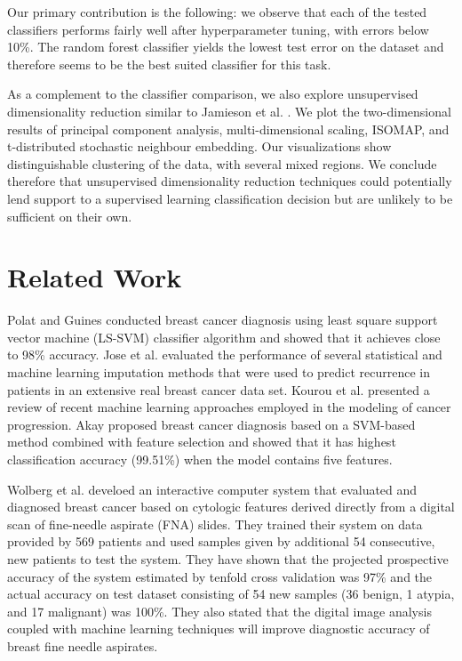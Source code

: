 \documentclass{article}
\begin{document}
Our primary contribution is the following: we observe that each of the tested classifiers performs fairly well after hyperparameter tuning, with errors below 10\%. The random forest classifier yields the lowest test error on the dataset and therefore seems to be the best suited classifier for this task.

As a complement to the classifier comparison, we also explore unsupervised dimensionality reduction similar to Jamieson et al. \cite{tsne2010}. We plot the two-dimensional results of principal component analysis, multi-dimensional scaling, ISOMAP, and t-distributed stochastic neighbour embedding. Our visualizations show distinguishable clustering of the data, with several mixed regions. We conclude therefore that unsupervised dimensionality reduction techniques could potentially lend support to a supervised learning classification decision but are unlikely to be sufficient on their own. 

\section{Related Work}

Polat and Guines \cite{POLAT2007694} conducted breast cancer diagnosis using least square support vector machine (LS-SVM) classifier algorithm and showed that it achieves close to 98\% accuracy. Jose et al. \cite{JEREZ2010105} evaluated the performance of several statistical and machine learning imputation methods that were used to predict recurrence in patients in an extensive real breast cancer data set.
Kourou et al. \cite{KOUROU20158} presented a review of recent machine learning approaches employed in the modeling of cancer progression. Akay \cite{AKAY20093240} proposed breast cancer diagnosis based on a SVM-based method combined with feature selection and showed that it has highest classification accuracy (99.51\%) when the model contains five features. 

Wolberg et al. \cite{WOLBERG1994163} develoed an interactive computer system that evaluated and diagnosed breast cancer based on cytologic features derived directly from a digital scan of fine-needle aspirate (FNA) slides. They trained their system on data provided by 569 patients and used samples given by additional 54 consecutive, new patients to test the system. They have shown that the projected prospective accuracy of the system estimated by tenfold cross validation was 97\% and the actual accuracy on test dataset consisting of 54 new samples (36 benign, 1 atypia, and 17 malignant) was 100\%. They also stated that the digital image analysis coupled with machine learning techniques will improve diagnostic accuracy of breast fine needle aspirates.
\end{document}
